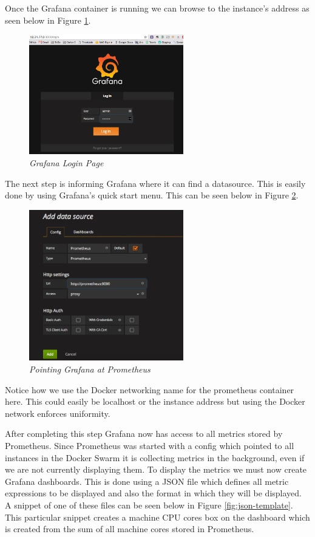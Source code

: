 Once the Grafana container is running we can browse to the instance's address as seen below in Figure \ref{fig:grafana}.

\begin{figure}[!h]
\centering
\includegraphics*[width=0.6\textwidth]{components/images/grafana}
\caption{\em Grafana Login Page}
\label{fig:grafana}
\end{figure}

The next step is informing Grafana where it can find a datasource. This is easily done by using Grafana's quick start menu. This can be seen below in Figure \ref{fig:add-source}.

\begin{figure}[!h]
\centering
\includegraphics*[width=0.6\textwidth]{components/images/add-source}
\caption{\em Pointing Grafana at Prometheus}
\label{fig:add-source}
\end{figure}

Notice how we use the Docker networking name for the prometheus container here. This could easily be localhost or the instance address but using the Docker network enforces uniformity.

After completing this step Grafana now has access to all metrics stored by Prometheus. Since Prometheus was started with a config which pointed to all instances in the Docker Swarm it is collecting metrics in the background, even if we are not currently displaying them. To display the metrics we must now create Grafana dashboards. This is done using a JSON file which defines all metric expressions to be displayed and also the format in which they will be displayed. A snippet of one of these files can be seen below in Figure \ref{fig:json-template}. This particular snippet creates a machine CPU cores box on the dashboard which is created from the sum of all machine cores stored in Prometheus.

